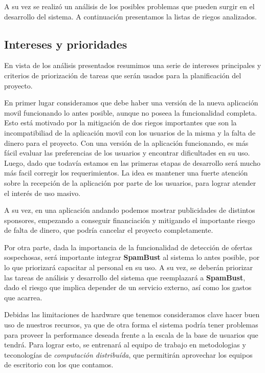 \documentclass[10pt, a4paper]{article}
\begin{document}
A su vez se realizó un análisis de los posibles problemas que pueden surgir en el desarrollo del sistema. A continuación presentamos la listas de riegos analizados.



\subsection{Intereses y prioridades}

En vista de los análisis presentados resumimos una serie de intereses principales y criterios de priorización de tareas que serán usados para la planificación del proyecto. 

En primer lugar consideramos que debe haber una versión de la nueva aplicación movil funcionando lo antes posible, aunque no poseea la funcionalidad completa. Esto está motivado por la mitigación de dos riegos importantes que son la incompatibiliad de la aplicación movil con los usuarios de la misma y la falta de dinero para el proyecto. Con una versión de la aplicación funcionando, es más fácil evaluar las preferencias de los usuarios y encontrar dificultades en su uso. Luego, dado que todavía estamos en las primeras etapas de desarrollo será mucho más facil corregir los requerimientos. La idea es mantener una fuerte atención sobre la recepción de la aplicación por parte de los usuarios, para lograr atender el interés de uso masivo.

A su vez, en una aplicación andando podemos mostrar publicidades de distintos sponsores, empezando a conseguir financiación y mitigando el importante riesgo de falta de dinero, que podría cancelar el proyecto completamente.

Por otra parte, dada la importancia de la funcionalidad de detección de ofertas sospechosas, será importante integrar \textbf{SpamBust} al sistema lo antes posible, por lo que priorizará capacitar al personal en su uso. A su vez, se deberán priorizar las tareas de análisis y desarrollo del sistema que reemplazará a \textbf{SpamBust}, dado el riesgo que implica depender de un servicio externo, así como los gastos que acarrea. 

Debidas las limitaciones de hardware que tenemos consideramos clave hacer buen uso de nuestros recursos, ya que de otra forma el sistema podría tener problemas para proveer la performance deseada frente a la escala de la base de usuarios que tendrá. Para lograr esto, se entrenará al equipo de trabajo en metodologias y teconologías de \emph{computación distribuída}, que permitirán aprovechar los equipos de escritorio con los que contamos. 
\end{document}
